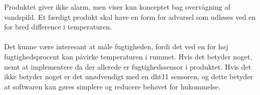 Produktet giver ikke alarm, men viser kun konceptet bag overvågning af vandspild. Et færdigt produkt skal have en form for advarsel som udløses ved en for bred difference i temperaturen.
\\
\\
Det kunne være interesant at måle fugtigheden, fordi det ved en for høj fugtighedsprocent kan påvirke temperaturen i rummet. Hvis det betyder noget, nemt at implementere da der allerede er fugtighedssensor i produktet. Hvis det ikke betyder noget er det unødvendigt med en dht11 sensoren, og dette betyder at softwaren kan gøres simplere og reducere behøvet for hukommelse.


